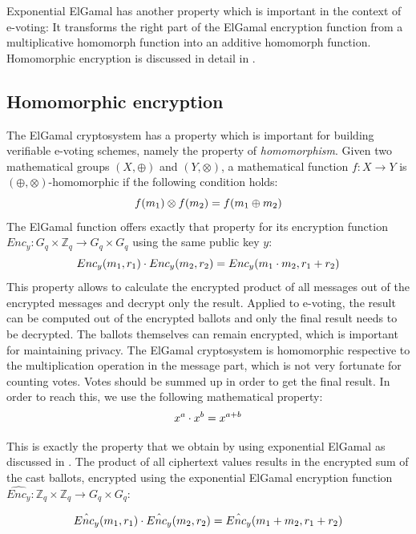 \documentclass[numbers=noenddot, abstract=on, a4paper, headsepline,
footsepline, oneside, draft=off]{scrreprt}
\begin{document}
Exponential ElGamal has another property which is important in the context of
e-voting: It transforms the right part of the ElGamal encryption function from a
multiplicative homomorph function into an additive homomorph function.
Homomorphic encryption is discussed in detail in .

\subsection{Homomorphic encryption}
\label{sec:homenc}
The ElGamal cryptosystem has a property
which is important for building verifiable e-voting schemes, namely the property
of \emph{homomorphism}. Given two mathematical groups $(X,\oplus)$ and
$(Y,\otimes)$, a mathematical function $f:X \rightarrow Y$ is $(\oplus, \otimes)$-homomorphic if
the following condition holds:
\begin{equation}
f(m_1) \otimes f(m_2) = f(m_1 \oplus m_2) \notag
\end{equation}
The ElGamal function offers exactly that property for its encryption function
$Enc_y:G_q \times \mathbb{Z}_q \rightarrow G_q \times G_q$ using the same public key $y$:
\begin{equation}
Enc_y(m_1, r_1) \cdot Enc_y(m_2, r_2) = Enc_y(m_1 \cdot m_2, r_1 + r_2)
\notag
\end{equation}
This property allows to calculate the encrypted product of all messages out of
the encrypted messages and decrypt only the result. Applied to e-voting, the
result can be computed out of the encrypted ballots and only the final result
needs to be decrypted. The ballots themselves can remain encrypted, which is
important for maintaining privacy. The ElGamal cryptosystem is homomorphic
respective to the multiplication operation in the message part, which is not
very fortunate for counting votes. Votes should be summed up in order to get the
final result. In order to reach this, we use the following mathematical property:
\begin{equation}
x^a \cdot x^b = x^{a+b} \notag
\end{equation}

This is exactly the property that we obtain by using exponential ElGamal as
discussed in . The product of all ciphertext
values results in the encrypted sum of the cast ballots, encrypted using the
exponential ElGamal encryption function $\hat{Enc_y}:\mathbb{Z}_q \times
\mathbb{Z}_q \rightarrow G_q \times G_q$:

\begin{equation}
\hat{Enc_y}(m_1, r_1) \cdot \hat{Enc_y}(m_2, r_2) = \hat{Enc_y}(m_1 + m_2, r_1 +
r_2)
\notag
\end{equation}
\end{document}
